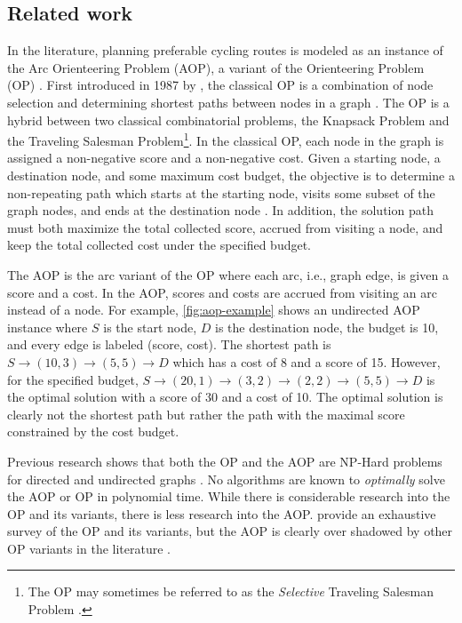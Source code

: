 \documentclass[honors]{union-cs-thesis}
\begin{document}
\subsection{Related work} \label{sec:relatedwork}
In the literature, planning preferable cycling routes is modeled as an instance of the Arc Orienteering Problem (AOP), a variant of the Orienteering Problem (OP) \cite{souffriau2011planning}. First introduced in 1987 by \citeauthor{golden1987orienteering}, the classical OP is a combination of node selection and determining shortest paths between nodes in a graph \cite{golden1987orienteering}. The OP is a hybrid between two classical combinatorial problems, the Knapsack Problem and the Traveling Salesman Problem\footnote{The OP may sometimes be referred to as the \emph{Selective} Traveling Salesman Problem \cite{laporte1990selective}.}. In the classical OP, each node in the graph is assigned a non-negative score and a non-negative cost. Given a starting node, a destination node, and some maximum cost budget, the objective is to determine a non-repeating path which starts at the starting node, visits some subset of the graph nodes, and ends at the destination node \cite{gunawan2016orienteering}. In addition, the solution path must both maximize the total collected score, accrued from visiting a node, and keep the total collected cost under the specified budget.

The AOP is the arc variant of the OP where each arc, i.e., graph edge, is given a score and a cost. In the AOP, scores and costs are accrued from visiting an arc instead of a node. For example, \cref{fig:aop-example} shows an undirected AOP instance where $S$ is the start node, $D$ is the destination node, the budget is 10, and every edge is labeled (score, cost). The shortest path is $S \rightarrow (10,3) \rightarrow (5,5) \rightarrow D$ which has a cost of 8 and a score of 15. However, for the specified budget, $S \rightarrow (20,1) \rightarrow (3,2) \rightarrow (2,2) \rightarrow (5,5) \rightarrow D$ is the optimal solution with a score of 30 and a cost of 10. The optimal solution is clearly not the shortest path but rather the path with the maximal score constrained by the cost budget.

Previous research shows that both the OP and the AOP are NP-Hard problems for directed and undirected graphs \cite{gunawan2016orienteering}. No algorithms are known to \emph{optimally} solve the AOP or OP in polynomial time. While there is considerable research into the OP and its variants, there is less research into the AOP. \citeauthor{gunawan2016orienteering} provide an exhaustive survey of the OP and its variants, but the AOP is clearly over shadowed by other OP variants in the literature \cite{gunawan2016orienteering}.
\end{document}
